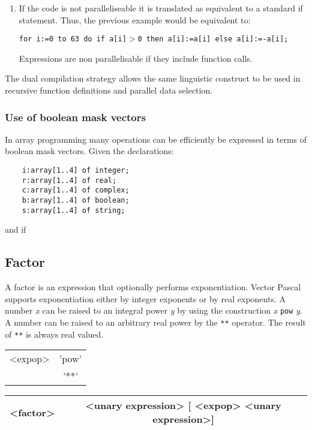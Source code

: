 {\begin{enumerate}
\item If the code is not paralleliseable it is translated as equivalent to a standard
if statement. Thus, the previous example would be equivalent to: 


\texttt{for i:=0 to 63 do if a{[}i{]}$ > $0 then a{[}i{]}:=a{[}i{]} else
a{[}i{]}:=-a{[}i{]};}

Expressions are non parallelisable if they include function calls. 

\end{enumerate}
The dual compilation strategy allows the same linguistic construct to be used
in recursive function definitions and parallel data selection. 

\subsubsection{Use of boolean mask vectors}
In array programming many operations can be efficiently be expressed in terms
of boolean mask vectors.
Given the declarations:\begin{verbatim}
    i:array[1..4] of integer;
    r:array[1..4] of real;
    c:array[1..4] of complex;
    b:array[1..4] of boolean;
    s:array[1..4] of string;\end{verbatim}
and if 
    
\subsection{Factor}

A factor is an expression that optionally performs exponentiation. Vector Pascal
supports exponentiation either by integer exponents or by real exponents. A
number \emph{x} can be raised to an integral power \emph{y} by using the construction
\emph{x} \texttt{pow} \emph{y}. A number can be raised to an arbitrary
real power by the \texttt{{*}{*}} operator. The result of \texttt{{*}{*}\index{**}}
is always real valued.

\vspace{0.3cm}
{\centering \begin{tabular}{|c|c|}
\hline 
<expop>&
'pow'\\
&
'{*}{*}'\\
\hline 
\end{tabular}\par}
\vspace{0.3cm}

\vspace{0.3cm}
{\centering \begin{tabular}{|c|c|}
\hline 
<factor>&
<unary expression> {[} <expop> <unary expression>{]}\\
\hline 
\end{tabular}\par}
\vspace{0.3cm}


}
